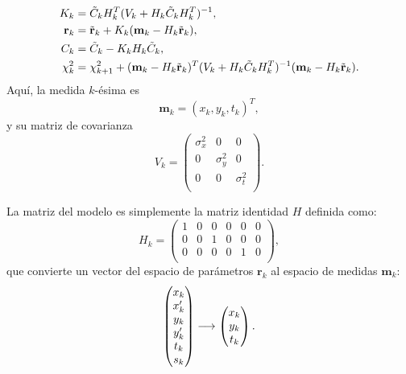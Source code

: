 \documentclass[a4paper]{article}
\let\vec\mathbf  %
\begin{document}
\begin{align}
\notag
K_k &= \tilde{C}_k H_k^T (V_k + H_k \tilde{C}_k H_k^T )^{-1},\\ \notag
\vec{r}_k &= \tilde{\vec{r}}_k + K_k (\vec{m}_k - H_k \tilde{\vec{r}}_k),\\ \notag
C_k &= \tilde{C}_k - K_k H_k \tilde{C}_k,\\
\chi^2_k &= \chi^2_{k+1} + (\vec{m}_k - H_k \tilde{\vec{r}}_k )^T (V_k + H_k \tilde{C}_k H_k^T )^{-1} (\vec{m}_k - H_k \tilde{\vec{r}}_k ).
\label{eq:K}
\end{align}
Aquí, la medida $k$-ésima es
\begin{equation}
\vec{m}_k = (x_k, y_k, t_k)^T,
\label{eq:m}
\end{equation}
y su matriz de covarianza
\begin{equation}
V_k = \left(
\begin{matrix}
\sigma_x^2 & 0                        & 0                      \\
0                        & \sigma_y^2 & 0                       \\
0                        & 0                        & \sigma_t^2 \\
\end{matrix} \right).
\label{eq:V}
\end{equation}

La matriz del modelo es simplemente la matriz identidad $H$ definida como:
\begin{equation}
H_k = 
\left(
\begin{matrix}
1 & 0 & 0 & 0 & 0 & 0    \\
0 & 0 & 1 & 0 & 0 & 0     \\
0 & 0 & 0 & 0 & 1 & 0      \\
\end{matrix}\right),
\label{eq:h}
\end{equation}
que convierte un vector del espacio de parámetros $\vec{r}_k$ al espacio de medidas $\vec{m}_k$:
\begin{equation}
    \notag
    \left(
        \begin{matrix}
            x_k \\
            x_k' \\
            y_k \\
            y_k' \\
            t_k \\
            s_k
        \end{matrix}
    \right)
    \longrightarrow
    \left(
        \begin{matrix}
            x_k \\
            y_k \\
            t_k
        \end{matrix}
    \right).
\end{equation}
\end{document}
